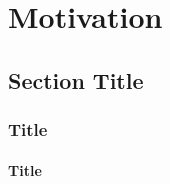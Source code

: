 \chapter{Motivation}
\section{Section Title}
\subsection{Title}
\Blindtext
\subsubsection{Title}
\Blindtext
